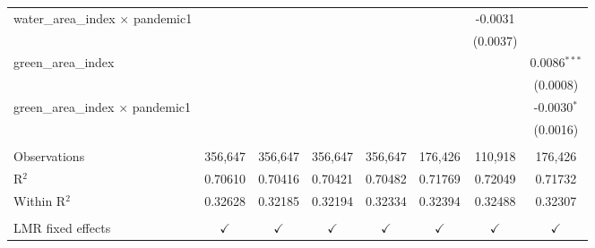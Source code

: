 \begin{table}[htbp]
\begin{threeparttable}[b]
\begin{tabular}{lccccccc}
         water\_area\_index $\times$ pandemic1      &                         &                        &                        &                         &                 & -0.0031         &   \\   
                                                    &                         &                        &                        &                         &                 & (0.0037)        &   \\   
         green\_area\_index                         &                         &                        &                        &                         &                 &                 & 0.0086$^{***}$\\   
                                                    &                         &                        &                        &                         &                 &                 & (0.0008)\\   
         green\_area\_index $\times$ pandemic1      &                         &                        &                        &                         &                 &                 & -0.0030$^{*}$\\   
                                                    &                         &                        &                        &                         &                 &                 & (0.0016)\\   
          \\
         Observations                               & 356,647                 & 356,647                & 356,647                & 356,647                 & 176,426         & 110,918         & 176,426\\  
         R$^2$                                      & 0.70610                 & 0.70416                & 0.70421                & 0.70482                 & 0.71769         & 0.72049         & 0.71732\\  
         Within R$^2$                               & 0.32628                 & 0.32185                & 0.32194                & 0.32334                 & 0.32394         & 0.32488         & 0.32307\\  
          \\
         LMR fixed effects                          & $\checkmark$            & $\checkmark$           & $\checkmark$           & $\checkmark$            & $\checkmark$    & $\checkmark$    & $\checkmark$\\   
         \bottomrule
      \end{tabular}
   \end{threeparttable}
\end{table}


